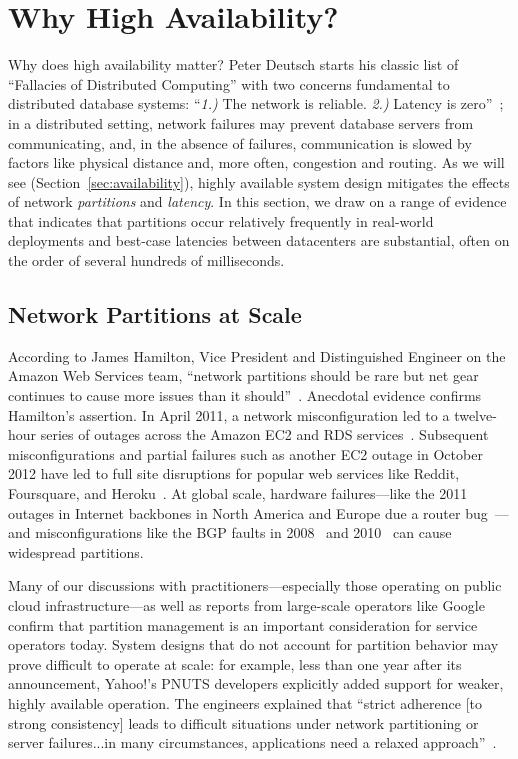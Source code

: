 
\section{Why High Availability?}
\label{sec:motivation}

Why does high availability matter? Peter Deutsch starts his classic
list of ``Fallacies of Distributed Computing'' with two concerns
fundamental to distributed database systems: ``\textit{1.)}  The
network is reliable. \textit{2.)} Latency is
zero''~\cite{fallacies-deutsch}; in a distributed setting, network
failures may prevent database servers from communicating, and, in the
absence of failures, communication is slowed by factors like physical
distance and, more often, congestion and routing. As we will see
(Section~\ref{sec:availability}), highly available system design
mitigates the effects of network \textit{partitions} and
\textit{latency}. In this section, we draw on a range of evidence that
indicates that partitions occur relatively frequently in real-world
deployments and best-case latencies between datacenters are
substantial, often on the order of several hundreds of milliseconds.

\subsection{Network Partitions at Scale}

According to James Hamilton, Vice President and Distinguished Engineer
on the Amazon Web Services team, ``network partitions should be rare
but net gear continues to cause more issues than it
should''~\cite{hamilton-partitions}. Anecdotal evidence confirms
Hamilton's assertion. In April 2011, a network misconfiguration led to
a twelve-hour series of outages across the Amazon EC2 and RDS
services~\cite{amazon-netpartition}. Subsequent misconfigurations and
partial failures such as another EC2 outage in October 2012 have led
to full site disruptions for popular web services like Reddit,
Foursquare, and Heroku~\cite{ec2-downsites}. At global scale,
hardware failures---like the 2011 outages in Internet backbones in
North America and Europe due a router
bug~\cite{juniper-partition}---and misconfigurations like the BGP
faults in 2008~\cite{pakistan-youtube} and
2010~\cite{research-experiment-partition} can cause widespread
partitions.

Many of our discussions with practitioners---especially those
operating on public cloud infrastructure---as well as reports from
large-scale operators like Google~\cite{dean-keynote} confirm that
partition management is an important consideration for service
operators today. System designs that do not account for partition
behavior may prove difficult to operate at scale: for example, less
than one year after its announcement, Yahoo!'s PNUTS developers
explicitly added support for weaker, highly available operation. The
engineers explained that ``strict adherence [to strong consistency]
leads to difficult situations under network partitioning or server
failures...in many circumstances, applications need a relaxed
approach''~\cite{pnuts-update}.

